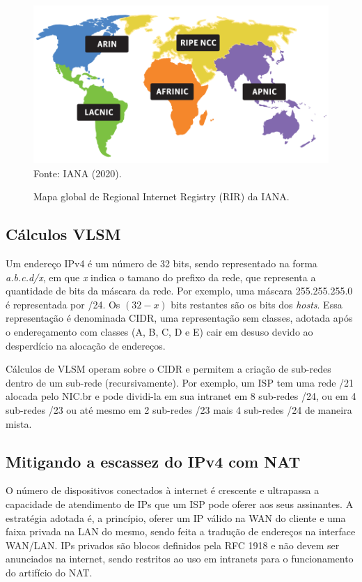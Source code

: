     \begin{figure}[!htb]
        \centering
        \caption{Mapa global de Regional Internet Registry (RIR) da IANA.} 
        \label{fig:rir_map} 
        \includegraphics[scale=1.5]{img/rir-map.png} \\
        {\small Fonte: IANA (2020).} 
    \end{figure}
    
\subsection{Cálculos VLSM}

    Um endereço IPv4 é um número de 32 bits, sendo representado na forma \textit{a.b.c.d/x}, em que \textit{x} indica o tamano do prefixo da rede, que representa a quantidade de bits da máscara da rede. Por exemplo, uma máscara 255.255.255.0 é representada por /24. Os $(32 - x)$ bits restantes são os bits dos \textit{hosts}. Essa representação é denominada CIDR, uma representação sem classes, adotada após o endereçamento com classes (A, B, C, D e E) cair em desuso devido ao desperdício na alocação de endereços.
    
    Cálculos de VLSM operam sobre o CIDR e permitem a criação de sub-redes dentro de um sub-rede (recursivamente). Por exemplo, um ISP tem uma rede /21 alocada pelo NIC.br e pode dividi-la em sua intranet em 8 sub-redes /24, ou em 4 sub-redes /23 ou até mesmo em 2 sub-redes /23 mais 4 sub-redes /24 de maneira mista.

\subsection{Mitigando a escassez do IPv4 com NAT}

    O número de dispositivos conectados à internet é crescente e ultrapassa a capacidade de atendimento de IPs que um ISP pode oferer aos seus assinantes. A estratégia adotada é, a princípio, oferer um IP válido na WAN do cliente e uma faixa privada na LAN do mesmo, sendo feita a tradução de endereços na interface WAN/LAN. IPs privados são blocos definidos pela RFC 1918 e não devem ser anunciados na internet, sendo restritos ao uso em intranets para o funcionamento do artifício do NAT.
    
